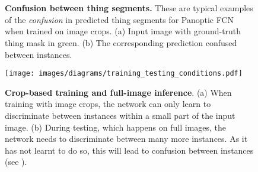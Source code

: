 \documentclass[10pt,twocolumn,letterpaper]{article}
\begin{document}
\begin{figure}[t]
\centering
{}\\
\\
\begin{subfigure}[b]{0.49\linewidth}
\caption{}
\end{subfigure}
\begin{subfigure}[b]{0.49\linewidth}
\caption{}
\end{subfigure}
\vspace{-15pt}
\caption{\textbf{Confusion between thing segments.} These are typical examples of the \textit{confusion} in predicted thing segments for Panoptic FCN~\cite{li2021panopticfcn} when trained on image crops. (a) Input image with ground-truth thing mask in green. (b) The corresponding prediction confused between instances.}
\label{fig:problem_examples}
\vspace{-5pt}
\end{figure} 
\begin{figure}[t]
\centering
\texttt{[image: images/diagrams/training\_testing\_conditions.pdf]}
\vspace{-12pt}
\caption{\textbf{Crop-based training and full-image inference}. (a) When training with image crops, the network can only learn to discriminate between instances within a small part of the input image. (b) During testing, which happens on full images, the network needs to discriminate between many more instances. As it has not learnt to do so, this will lead to confusion between instances (see ).}
\label{fig:training_testing_conditions}
\vspace{-5pt}
\end{figure}
 
\end{document}
